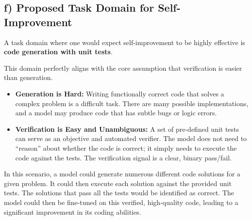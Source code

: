\documentclass{solutionclass} %
\begin{document}
\subsection{f) Proposed Task Domain for Self-Improvement}
A task domain where one would expect self-improvement to be highly effective is \textbf{code generation with unit tests}.

This domain perfectly aligns with the core assumption that verification is easier than generation.
\begin{itemize}
    \item \textbf{Generation is Hard:} Writing functionally correct code that solves a complex problem is a difficult task. There are many possible implementations, and a model may produce code that has subtle bugs or logic errors.
    \item \textbf{Verification is Easy and Unambiguous:} A set of pre-defined unit tests can serve as an objective and automated verifier. The model does not need to ``reason'' about whether the code is correct; it simply needs to execute the code against the tests. The verification signal is a clear, binary pass/fail.
\end{itemize}
In this scenario, a model could generate numerous different code solutions for a given problem. It could then execute each solution against the provided unit tests. The solutions that pass all the tests would be identified as correct. The model could then be fine-tuned on this verified, high-quality code, leading to a significant improvement in its coding abilities.

    \thispagestyle{fancyplain}
    \fancyhead{}
    \renewcommand{\headrulewidth}{0pt}
\end{document}
